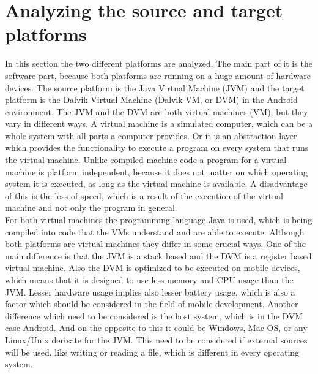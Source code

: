 \section{Analyzing the source and target platforms} 
\label{sec:migration:analysing-the-source-and-target-platform}
In this section the two different platforms are analyzed.
The main part of it is the software part, because both platforms are running on a huge amount of hardware devices.
The source platform is the Java Virtual Machine (JVM) and the target platform is the Dalvik Virtual Machine (Dalvik VM, or DVM) in the Android environment.
The JVM and the DVM are both virtual machines (VM), but they vary in different ways.
A virtual machine is a simulated computer, which can be a whole system with all parts a computer provides.
Or it is an abstraction layer which provides the functionality to execute a program on every system that runs the virtual machine.
Unlike compiled machine code a program for a virtual machine is platform independent, because it does not matter on which operating system it is executed, as long as the virtual machine is available.
A disadvantage of this is the loss of speed, which is a result of the execution of the virtual machine and not only the program in general.~\cite{craig2006virtual}
\\
For both virtual machines the programming language Java is used, which is being compiled into code that the VMs understand and are able to execute.
Although both platforms are virtual machines they differ in some crucial ways.
One of the main difference is that the JVM is a stack based and the DVM is a register based virtual machine.
Also the DVM is optimized to be executed on mobile devices, which means that it is designed to use less memory and CPU usage than the JVM.
Lesser hardware usage implies also lesser battery usage, which is also a factor which should be considered in the field of mobile development.
Another difference which need to be considered is the host system, which is in the DVM case Android.
And on the opposite to this it could be Windows, Mac OS, or any Linux/Unix derivate for the JVM. 
This need to be considered if external sources will be used, like writing or reading a file, which is different in every operating system.


